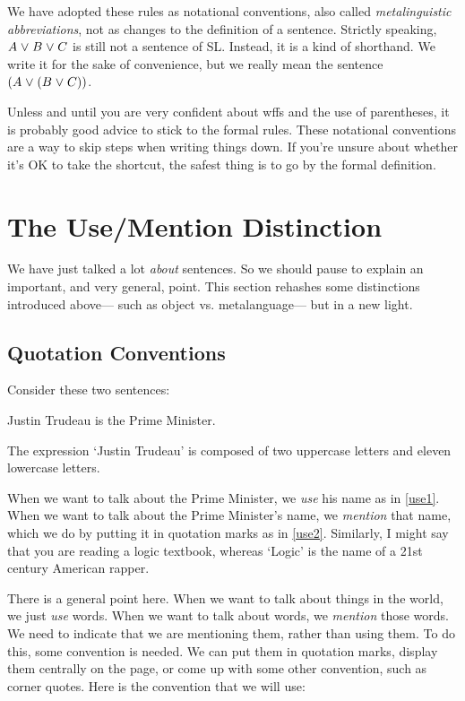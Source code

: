 We have adopted these rules as notational conventions, also called \textit{metalinguistic abbreviations}, not as changes to the definition of a sentence.
Strictly speaking, $A \mkern1mu\vee\mkern1mu B \mkern1mu\vee\mkern1mu C$ is still not a sentence of SL.
Instead, it is a kind of shorthand.
We write it for the sake of convenience, but we really mean the sentence $(A \mkern1mu\vee\mkern1mu (B \mkern1mu\vee\mkern1mu C))$.

Unless and until you are very confident about wffs and the use of parentheses, it is probably good advice to stick to the formal rules.
These notational conventions are a way to skip steps when writing things down.
If you're unsure about whether it's OK to take the shortcut, the safest thing is to go by the formal definition.




\section{The Use/Mention Distinction}
  \label{s:UseMention}

We have just talked a lot \emph{about} sentences.
So we should pause to explain an important, and very general, point.
This section rehashes some distinctions introduced above--- such as object vs. metalanguage--- but in a new light.



\subsection{Quotation Conventions}
  \label{sec:quotation}

Consider these two sentences:

\begin{earg}
  \item[\ex{use1}] Justin Trudeau is the Prime Minister.  
  \item[\ex{use2}] The expression `Justin Trudeau' is composed of two uppercase letters and eleven lowercase letters.
\end{earg}

When we want to talk about the Prime Minister, we \emph{use} his name as in \ref{use1}.
When we want to talk about the Prime Minister's name, we \emph{mention} that name, which we do by putting it in quotation marks as in \ref{use2}.
Similarly, I might say that you are reading a logic textbook, whereas `Logic' is the name of a 21st century American rapper. 

There is a general point here.
When we want to talk about things in the world, we just \emph{use} words.
When we want to talk about words, we \emph{mention} those words.
We need to indicate that we are mentioning them, rather than using them.
To do this, some convention is needed.
We can put them in quotation marks, display them centrally on the page, or come up with some other convention, such as corner quotes. 
Here is the convention that we will use:

